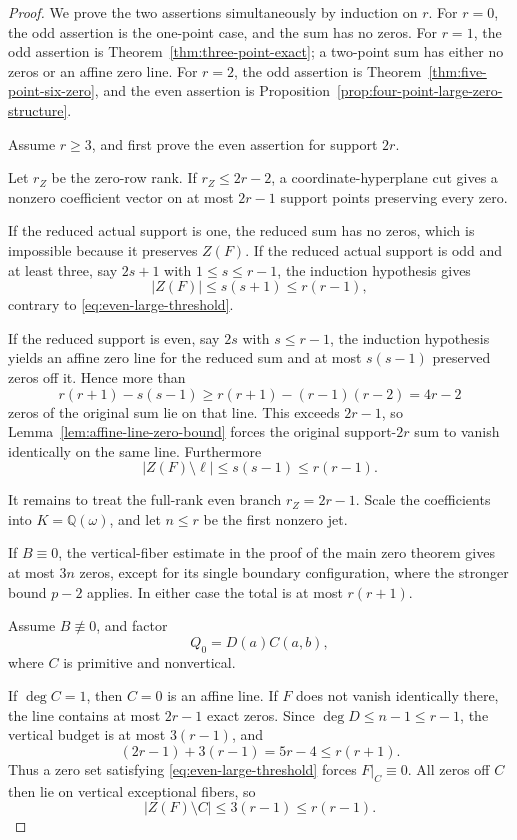 \documentclass[11pt]{article}
\newcommand{\Q}{\mathbb Q}
\begin{document}
\begin{proof}
We prove the two assertions simultaneously by induction on \(r\).
For \(r=0\), the odd assertion is the one-point case, and the sum has no
zeros.  For \(r=1\), the odd assertion is
Theorem~\ref{thm:three-point-exact}; a two-point sum has either no
zeros or an affine zero line.  For \(r=2\), the odd assertion is
Theorem~\ref{thm:five-point-six-zero}, and the even assertion is
Proposition~\ref{prop:four-point-large-zero-structure}.

Assume \(r\ge3\), and first prove the even assertion for support
\(2r\).

Let \(r_Z\) be the zero-row rank.  If \(r_Z\le2r-2\), a
coordinate-hyperplane cut gives a nonzero coefficient vector on at
most \(2r-1\) support points preserving every zero.

If the reduced actual support is one, the reduced sum has no zeros,
which is impossible because it preserves \(Z(F)\).  If the reduced actual
support is odd and at least three, say \(2s+1\) with \(1\le s\le r-1\),
the induction hypothesis gives
\[
 |Z(F)|\le s(s+1)\le r(r-1),
\]
contrary to \eqref{eq:even-large-threshold}.

If the reduced support is even, say \(2s\) with \(s\le r-1\), the
induction hypothesis yields an affine zero line for the reduced sum
and at most \(s(s-1)\) preserved zeros off it.  Hence more than
\[
 r(r+1)-s(s-1)
 \ge
 r(r+1)-(r-1)(r-2)
 =
4r-2
\]
zeros of the original sum lie on that line.  This exceeds \(2r-1\),
so Lemma~\ref{lem:affine-line-zero-bound} forces the original
support-\(2r\) sum to vanish identically on the same line.
Furthermore
\[
 |Z(F)\setminus\ell|
 \le
 s(s-1)
 \le
 r(r-1).
\]

It remains to treat the full-rank even branch \(r_Z=2r-1\).
Scale the coefficients into \(K=\Q(\omega)\), and let \(n\le r\) be
the first nonzero jet.

If \(B\equiv0\), the vertical-fiber estimate in the proof of the main
zero theorem gives at most \(3n\) zeros, except for its single boundary
configuration, where the stronger bound \(p-2\) applies.  In either
case the total is at most \(r(r+1)\).

Assume \(B\not\equiv0\), and factor
\[
 Q_0=D(a)C(a,b),
\]
where \(C\) is primitive and nonvertical.

If \(\deg C=1\), then \(C=0\) is an affine line.  If \(F\) does not
vanish identically there, the line contains at most \(2r-1\) exact
zeros.  Since \(\deg D\le n-1\le r-1\), the vertical budget is at most
\(3(r-1)\), and
\[
 (2r-1)+3(r-1)=5r-4\le r(r+1).
\]
Thus a zero set satisfying \eqref{eq:even-large-threshold} forces
\(F|_C\equiv0\).  All zeros off \(C\) then lie on vertical exceptional
fibers, so
\[
 |Z(F)\setminus C|
 \le3(r-1)
 \le r(r-1).
\]


\end{proof}
\end{document}
